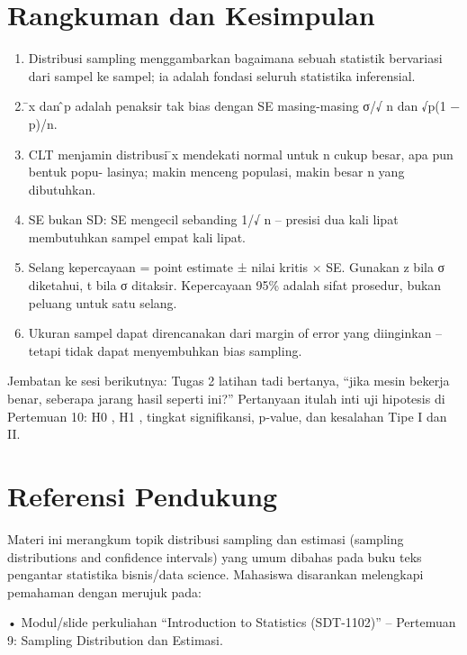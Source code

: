 \documentclass[
  indonesian,
  letterpaper,
]{book}
\begin{document}

\chapter{Rangkuman dan Kesimpulan}\label{rangkuman-dan-kesimpulan}

\begin{enumerate}
\def\labelenumi{\arabic{enumi}.}
\item
  Distribusi sampling menggambarkan bagaimana sebuah statistik
  bervariasi dari sampel ke sampel; ia adalah fondasi seluruh statistika
  inferensial.
\item
  ̄x dan ̂p adalah penaksir tak bias dengan SE masing-masing σ/√ n dan
  √p(1 − p)/n.
\item
  CLT menjamin distribusi ̄x mendekati normal untuk n cukup besar, apa
  pun bentuk popu- lasinya; makin menceng populasi, makin besar n yang
  dibutuhkan.
\item
  SE bukan SD: SE mengecil sebanding 1/√ n -- presisi dua kali lipat
  membutuhkan sampel empat kali lipat.
\item
  Selang kepercayaan = point estimate ± nilai kritis × SE. Gunakan z
  bila σ diketahui, t bila σ ditaksir. Kepercayaan 95\% adalah sifat
  prosedur, bukan peluang untuk satu selang.
\item
  Ukuran sampel dapat direncanakan dari margin of error yang diinginkan
  -- tetapi tidak dapat menyembuhkan bias sampling.
\end{enumerate}

Jembatan ke sesi berikutnya: Tugas 2 latihan tadi bertanya, ``jika mesin
bekerja benar, seberapa jarang hasil seperti ini?'' Pertanyaan itulah
inti uji hipotesis di Pertemuan 10: H0 , H1 , tingkat signifikansi,
p-value, dan kesalahan Tipe I dan II.


\chapter{Referensi Pendukung}\label{referensi-pendukung}

Materi ini merangkum topik distribusi sampling dan estimasi (sampling
distributions and confidence intervals) yang umum dibahas pada buku teks
pengantar statistika bisnis/data science. Mahasiswa disarankan
melengkapi pemahaman dengan merujuk pada:

• Modul/slide perkuliahan ``Introduction to Statistics (SDT-1102)'' --
Pertemuan 9: Sampling Distribution dan Estimasi.
\end{document}
